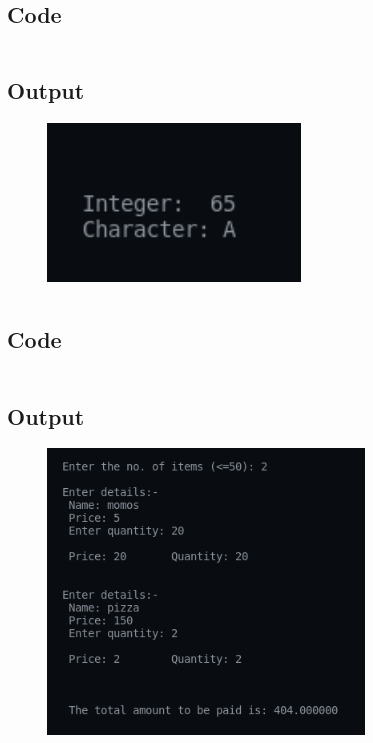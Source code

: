 \documentclass[12pt]{article}
\begin{document}
\newpage
\section{}
\subsection{Code}
\inputminted{c}{q8.c}
\subsection{Output}
\begin{figure}[h]
    \centering
    \includegraphics[width=0.6\textwidth]{8.png}
\end{figure}
\newpage
\section{}
\subsection{Code}
\inputminted{c}{q9a.c}
\subsection{Output}
\begin{figure}[h]
    \centering
    \includegraphics[width=0.75\textwidth]{9a.png}
\end{figure}
\newpage
\end{document}
